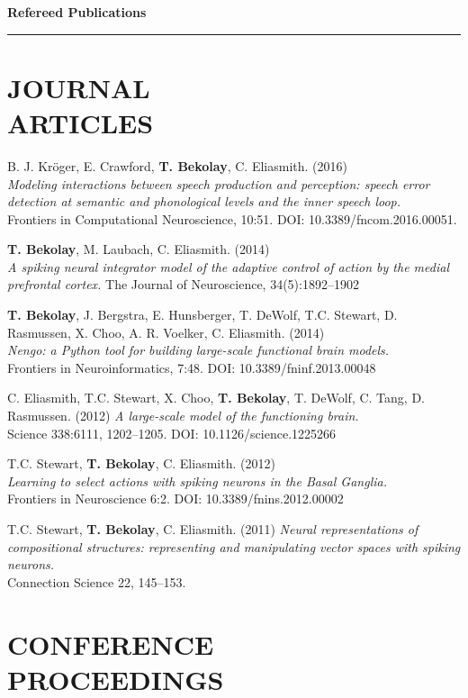 \documentclass[line,margin]{res}
\begin{document}
\begin{resume}
{\Large \bf Refereed Publications} \\ \vspace{-8pt} \hrule

\section{JOURNAL \\ARTICLES}

B. J. Kr\"{o}ger, E. Crawford, \textbf{T. Bekolay}, C. Eliasmith. (2016) \\
  {\sl Modeling interactions between speech production and perception:
  speech error detection at semantic and phonological levels
  and the inner speech loop.} \\
  Frontiers in Computational Neuroscience, 10:51.
  DOI: 10.3389/fncom.2016.00051.

\textbf{T. Bekolay}, M. Laubach, C. Eliasmith. (2014) \\
  {\sl A spiking neural integrator model of the adaptive control of action
  by the medial prefrontal cortex.}
  The Journal of Neuroscience, 34(5):1892--1902

\textbf{T. Bekolay}, J. Bergstra, E. Hunsberger, T. DeWolf, T.C. Stewart,
  D. Rasmussen, X. Choo, A. R. Voelker, C. Eliasmith. (2014) \\
  {\sl Nengo: a Python tool for building large-scale functional
  brain models.} \\ Frontiers in Neuroinformatics, 7:48.
  DOI: 10.3389/fninf.2013.00048

C. Eliasmith, T.C. Stewart, X. Choo, \textbf{T. Bekolay},
  T. DeWolf, C. Tang, D. Rasmussen. (2012)
  {\sl A large-scale model of the functioning brain.} \\
  Science 338:6111, 1202--1205. DOI: 10.1126/science.1225266

T.C. Stewart, \textbf{T. Bekolay}, C. Eliasmith. (2012) \\
  {\sl Learning to select actions with spiking neurons in the
  Basal Ganglia.} \\
  Frontiers in Neuroscience 6:2. DOI: 10.3389/fnins.2012.00002

T.C. Stewart, \textbf{T. Bekolay}, C. Eliasmith. (2011)
  {\sl Neural representations of compositional structures:
  representing and manipulating vector spaces with spiking neurons.} \\
  Connection Science 22, 145--153.

\section{CONFERENCE \\PROCEEDINGS}


\end{resume}
\end{document}
